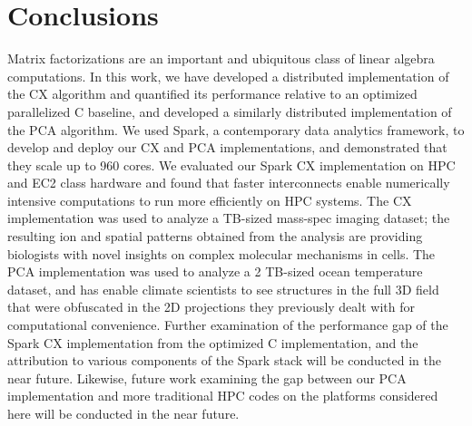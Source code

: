\section{Conclusions}
\label{sec:conclusion}

Matrix factorizations are an important and ubiquitous class of linear algebra
computations. In this work, we have developed a distributed
implementation of the CX algorithm and quantified its performance relative to
an optimized parallelized C baseline, and developed a similarly distributed
implementation of the PCA algorithm. We used Spark, a contemporary data
analytics framework, to develop and deploy our CX and PCA implementations, and
demonstrated that they scale up to 960 cores. We
evaluated our Spark CX implementation on HPC and EC2 class hardware and found
that faster interconnects enable numerically intensive computations to run
more efficiently on HPC systems. The CX implementation was used
to analyze a TB-sized mass-spec imaging dataset; the resulting ion and
spatial patterns obtained from the analysis are providing biologists with novel
insights on complex molecular mechanisms in cells. The PCA implementation was used
to analyze a 2 TB-sized ocean temperature dataset, and has enable climate scientists
to see structures in the full 3D field that were obfuscated in the 2D
projections they previously dealt with for computational convenience. Further
examination of the performance gap of the Spark CX implementation from the
optimized C implementation, and the attribution to various components of the
Spark stack will be conducted in the near future. Likewise, future work
examining the gap between our PCA implementation and more traditional HPC codes
on the platforms considered here will be conducted in the near future.



